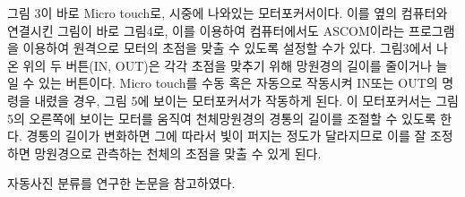 그림 3이 바로 Micro touch로, 시중에 나와있는 모터포커서이다. 이를 옆의 컴퓨터와 연결시킨 그림이 바로 그림4로, 이를 이용하여 컴퓨터에서도 ASCOM이라는 프로그램을 이용하여 원격으로 모터의 초점을 
맞출 수 있도록 설정할 수가 있다. 그림3에서 나온 위의 두 버튼(IN, OUT)은 각각 초점을 맞추기 위해 망원경의 길이를 줄이거나 늘일 수 있는 버튼이다. 
Micro touch를 수동 혹은 자동으로 작동시켜 IN또는 OUT의 명령을 내렸을 경우, 그림 5에 보이는 모터포커서가 작동하게 된다. 이 모터포커서는 그림 5의 오른쪽에 보이는 모터를 움직여 천체망원경의 경통의 길이를 조절할 수 있도록 한다. 경통의 길이가 변화하면 그에 따라서 빛이 퍼지는 정도가 달라지므로 이를 잘 조정하면 망원경으로 관측하는 천체의 초점을 맞출 수 있게 된다.

자동사진 분류를 연구한 논문을 참고하였다\cite{haningu2009}.